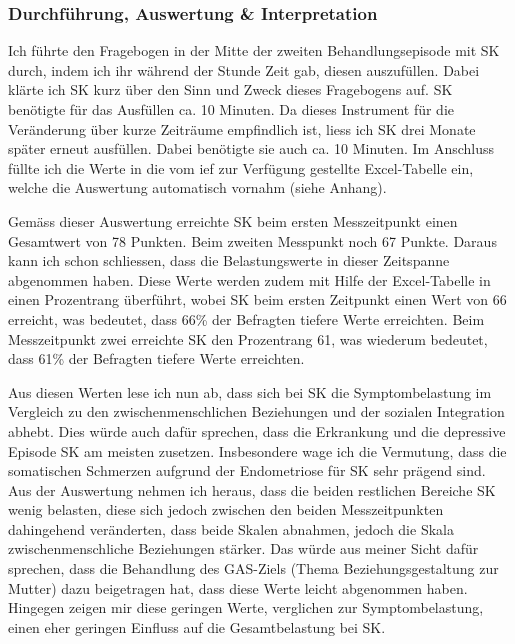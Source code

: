 \subsubsection{Durchführung, Auswertung \& Interpretation}
Ich führte den Fragebogen in der Mitte der zweiten Behandlungsepisode mit SK durch, indem ich ihr während der Stunde Zeit gab, diesen auszufüllen. Dabei klärte ich SK kurz über den Sinn und Zweck dieses Fragebogens auf. SK benötigte für das Ausfüllen ca. 10 Minuten. Da dieses Instrument für die Veränderung über kurze Zeiträume empfindlich ist, liess ich SK drei Monate später erneut ausfüllen. Dabei benötigte sie auch ca. 10 Minuten. Im Anschluss füllte ich die Werte in die vom \ac{ief} zur Verfügung gestellte Excel-Tabelle ein, welche die Auswertung automatisch vornahm (siehe Anhang). 

Gemäss dieser Auswertung erreichte SK beim ersten Messzeitpunkt einen Gesamtwert von 78 Punkten. Beim zweiten Messpunkt noch 67 Punkte. Daraus kann ich schon schliessen, dass die Belastungswerte in dieser Zeitspanne abgenommen haben. Diese Werte werden zudem mit Hilfe der Excel-Tabelle in einen Prozentrang überführt, wobei SK beim ersten Zeitpunkt einen Wert von 66 erreicht, was bedeutet, dass 66\% der Befragten tiefere Werte erreichten. Beim Messzeitpunkt zwei erreichte SK den Prozentrang 61, was wiederum bedeutet, dass 61\% der Befragten tiefere Werte erreichten. 

Aus diesen Werten lese ich nun ab, dass sich bei SK die Symptombelastung im Vergleich zu den zwischenmenschlichen Beziehungen und der sozialen Integration abhebt. Dies würde auch dafür sprechen, dass die Erkrankung und die depressive Episode SK am meisten zusetzen. Insbesondere wage ich die Vermutung, dass die somatischen Schmerzen aufgrund der Endometriose für SK sehr prägend sind. Aus der Auswertung nehmen ich heraus, dass die beiden restlichen Bereiche SK wenig belasten, diese sich jedoch zwischen den beiden  Messzeitpunkten dahingehend veränderten, dass beide Skalen abnahmen, jedoch die Skala zwischenmenschliche Beziehungen stärker. Das würde aus meiner Sicht dafür sprechen, dass die Behandlung des GAS-Ziels (Thema Beziehungsgestaltung zur Mutter) dazu beigetragen hat, dass diese Werte leicht abgenommen haben. Hingegen zeigen mir diese geringen Werte, verglichen zur Symptombelastung, einen eher geringen Einfluss auf die Gesamtbelastung bei SK.  

